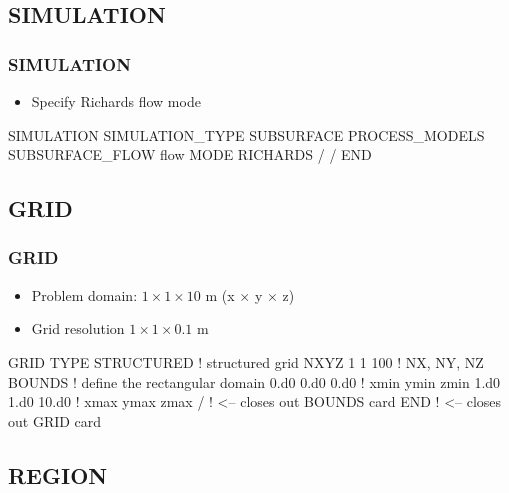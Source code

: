 \documentclass{beamer}
\newcommand\bluecomment[1]{{{\color{blue} #1}}}
\begin{document}
\subsection{SIMULATION}

\begin{frame}[fragile]\frametitle{SIMULATION}

\begin{itemize}
\item Specify Richards flow mode
\end{itemize}


\begin{semiverbatim}

SIMULATION
  SIMULATION_TYPE SUBSURFACE
  PROCESS_MODELS
    SUBSURFACE_FLOW flow
      MODE RICHARDS
    /
  /
END
\end{semiverbatim}

\end{frame}

\subsection{GRID}
\begin{frame}\frametitle{GRID}

\begin{itemize}
  \item Problem domain: $1 \times 1 \times 10$ m (x $\times$ y $\times$ z)
  \item Grid resolution $1 \times 1 \times 0.1$ m
\end{itemize}

\begin{semiverbatim}
GRID
  TYPE STRUCTURED        \bluecomment{! structured grid}
  NXYZ 1 1 100           \bluecomment{! NX, NY, NZ}
  BOUNDS             \bluecomment{! define the rectangular domain}
    0.d0 0.d0 0.d0   \bluecomment{! xmin ymin zmin}
    1.d0 1.d0 10.d0  \bluecomment{! xmax ymax zmax}
  /  \bluecomment{! <-- closes out BOUNDS card}
END  \bluecomment{! <-- closes out GRID card}
\end{semiverbatim}

\end{frame}

\subsection{REGION}
\end{document}
